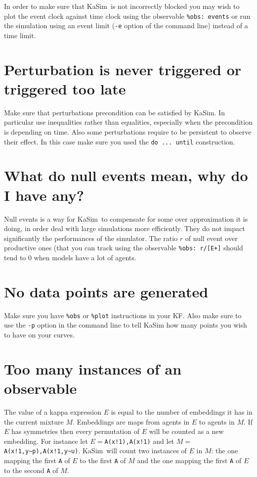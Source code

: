 \documentclass[11pt]{book}
\def\KaSim{\textsf{KaSim}}
\def\int{\hbox{\texttt{\~}}}
\def\ttt#1{\texttt{#1}}
\begin{document}
In order to make sure that \KaSim~is not incorrectly blocked you may wish to plot the event clock against time clock using the observable \ttt{\%obs: \textquotesingle events\textquotesingle  [E]} or run the simulation using an event limit (\ttt{-e} option of the command line) instead of a time limit.

\section*{Perturbation is never triggered or triggered too late}
Make sure that perturbation\textquotesingle s precondition can be satisfied by \KaSim. In particular use inequalities rather than equalities, especially when the precondition is depending on time. Also some perturbations require to be persistent to observe their effect. In this case make sure you used the \ttt{do ... until} construction.  

\section*{What do null events mean, why do I have any?}

Null events is a way for \KaSim~to compensate for some over approximation it is doing, in order deal with large simulations more efficiently. They do not impact significantly the performances of the simulator. The ratio $r$ of null event over productive ones (that you can track using the observable \ttt{\%obs: \textquotesingle r\textquotesingle   [E-]/[E+]} should tend to 0 when models have a lot of agents.

\section*{No data points are generated}
Make sure you have \ttt{\%obs} or \ttt{\%plot} instructions in your KF. Also make sure to use the \ttt{-p} option in the command line to tell KaSim how many points you wish to have on your curves. 

\section*{Too many instances of an observable}
The value of a kappa expression $E$  is equal to the number of embeddings it has in the current mixture $M$. Embeddings are maps from agents in $E$  to agents in $M$. If $E$ has symmetries then every permutation of $E$ will be counted as a new embedding. For instance let $E=$\ttt{A(x!1),A(x!1)} and let $M=$\ttt{A(x!1,y\int p),A(x!1,y\int u)}. \KaSim~will count two instances of $E$ in $M$: the one mapping the first \ttt{A} of $E$ to the first \ttt{A} of $M$ and the one mapping the first \ttt{A} of $E$ to the second \ttt{A} of $M$.
 
\end{document}
